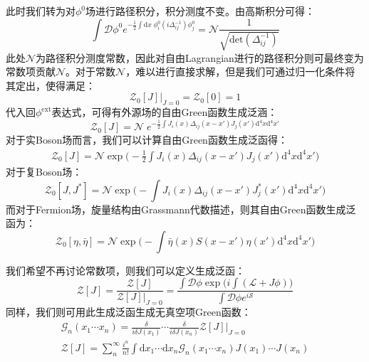 此时我们转为对$\phi^0$场进行路径积分，积分测度不变。由高斯积分可得：
\begin{equation}
\int\mathcal{D}\phi^0e^{-\frac{1}{2}\displaystyle{\int}\mathrm{d}x\;\phi^0_i (i\Delta^{-1}_{ij})\phi^0_j}=\mathcal{N}\frac{1}{\sqrt{\mathrm{det}(\Delta^{-1}_{ij})}}
\end{equation}
此处$\mathcal{N}$为路径积分测度常数，因此对自由Lagrangian进行的路径积分则可最终变为常数项贡献$\mathcal{N}$。对于常数$\mathcal{N}$，难以进行直接求解，但是我们可通过归一化条件将其定出，使得满足：
\begin{equation}
\mathcal{Z}_0[J]\Big|_{J=0}=\mathcal{Z}_0[0]=1
\end{equation}
代入回$\phi^{\text{ext}}$表达式，可得有外源场的自由Green函数生成泛涵：
\begin{equation}
\mathcal{Z}_0[J]=\mathcal{N}\;e^{-\frac{1}{2}\displaystyle{\int}J_i(x)\Delta_{ij}(x-x')J_j(x')\mathrm{d}^4x\mathrm{d}^4x'}
\end{equation}
对于实Boson场而言，我们可以计算自由Green函数生成泛函得：
\begin{align}
\mathcal{Z}_0[J]=\mathcal{N}\exp\Big(-\frac{1}{2}\int J_i(x)\Delta_{ij}(x-x')J_j(x')\mathrm{d}^4x\mathrm{d}^4x'\Big)
\label{eq:zrbos}
\end{align}
对于复Boson场：
\begin{equation}
\mathcal{Z}_0[J,J^*]=\mathcal{N}\exp\Big(-\int J_i(x)\Delta_{ij}(x-x')J_j^*(x')\mathrm{d}^4x\mathrm{d}^4x'\Big)
\end{equation}
而对于Fermion场，旋量结构由Grassmann代数描述，则其自由Green函数生成泛函为：
\begin{equation}
\mathcal{Z}_0[\eta,\bar{\eta}]=\mathcal{N}\exp\Big(-\int\bar{\eta}(x)S(x-x')\eta(x')\mathrm{d}^4x\mathrm{d}^4x'\Big)
\label{eq:zfer}
\end{equation}

我们希望不再讨论常数项，则我们可以定义生成泛函：
\begin{equation}
\mathscr{Z}[J]=\frac{\mathcal{Z}[J]}{\mathcal{Z}[J]\Big|_{J=0}}=\frac{\displaystyle{\int\mathcal{D}\phi\exp\Big(i\int(\mathscr{L}+J\phi)\Big)}}{\displaystyle{\int\mathcal{D}\phi e^{i\mathcal{S}}}}
\end{equation}
同样，我们则可用此生成泛函生成无真空项Green函数：
\begin{gather}
\mathscr{G}_n(x_1\cdots x_n)=\frac{\delta}{i\delta J(x_1)}\cdots\frac{\delta}{i\delta J(x_n)}\mathscr{Z}[J]\Big|_{J=0}\\
\mathscr{Z}[J]=\sum_{n}^{\infty}\frac{i^n}{n!}\int\mathrm{d}x_1\cdots\mathrm{d}x_n \mathscr{G}_n(x_1\cdots x_n)J(x_1)\cdots J(x_n)
\end{gather}

